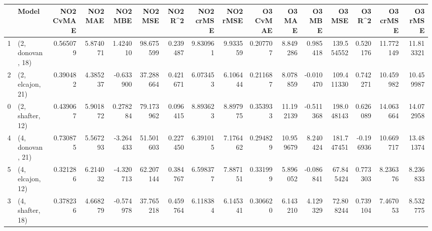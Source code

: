 \begin{tabular}{llrrrrrrrrrrrrrr}
\toprule
{} &             Model &  NO2 CvMAE &   NO2 MAE &   NO2 MBE &    NO2 MSE &   NO2 R\textasciicircum2 &  NO2 crMSE &  NO2 rMSE &  O3 CvMAE &     O3 MAE &    O3 MBE &      O3 MSE &    O3 R\textasciicircum2 &   O3 crMSE &    O3 rMSE \\
\midrule
1 &  (2, donovan, 18) &   0.565079 &  5.874071 &  1.424010 &  98.675599 &  0.239487 &   9.830961 &  9.933559 &  0.207707 &   8.849286 &  0.985418 &  139.554552 &  0.520176 &  11.772149 &  11.813321 \\
2 &  (2, elcajon, 21) &   0.390482 &  4.385237 & -0.633900 &  37.288664 &  0.421671 &   6.073453 &  6.106444 &  0.211687 &   8.078859 & -0.010470 &  109.411330 &  0.742271 &  10.459982 &  10.459987 \\
0 &  (2, shafter, 12) &   0.439067 &  5.901872 &  0.278284 &  79.173962 &  0.096415 &   8.893623 &  8.897975 &  0.353933 &  11.192139 & -0.511368 &  198.048143 &  0.626089 &  14.063664 &  14.072958 \\
4 &  (4, donovan, 21) &   0.730875 &  5.567293 & -3.264433 &  51.501603 &  0.227450 &   6.391015 &  7.176462 &  0.294829 &  10.959679 &  8.240424 &  181.747451 & -0.196936 &  10.669717 &  13.481374 \\
5 &  (4, elcajon, 12) &   0.321286 &  6.214032 & -4.320713 &  62.207144 &  0.384767 &   6.598377 &  7.887151 &  0.331999 &   5.896052 & -0.086841 &   67.845424 &  0.773303 &   8.236376 &   8.236833 \\
3 &  (4, shafter, 18) &   0.378236 &  4.668279 & -0.574978 &  37.765218 &  0.459764 &   6.118384 &  6.145341 &  0.306620 &   6.143210 &  4.129329 &   72.808244 &  0.739104 &   7.467053 &   8.532775 \\
\bottomrule
\end{tabular}

